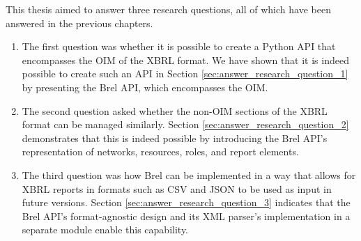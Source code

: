 
This thesis aimed to answer three research questions, all of which have been answered in the previous chapters.

\begin{enumerate}
    \item The first question was whether it is possible to create a Python API that encompasses the OIM of the XBRL format.
    We have shown that it is indeed possible to create such an API in Section \ref{sec:answer_research_question_1}
    by presenting the Brel API, which encompasses the OIM.
    \item The second question asked whether the non-OIM sections of the XBRL format can be managed similarly.
    Section \ref{sec:answer_research_question_2} demonstrates that this is indeed possible
    by introducing the Brel API's representation of networks, resources, roles, and report elements.
    \item The third question was how Brel can be implemented in a way that allows for XBRL reports in
    formats such as CSV and JSON to be used as input in future versions.
    Section \ref{sec:answer_research_question_3} indicates that the Brel API's format-agnostic design
    and its XML parser's implementation in a separate module enable this capability.
\end{enumerate}

